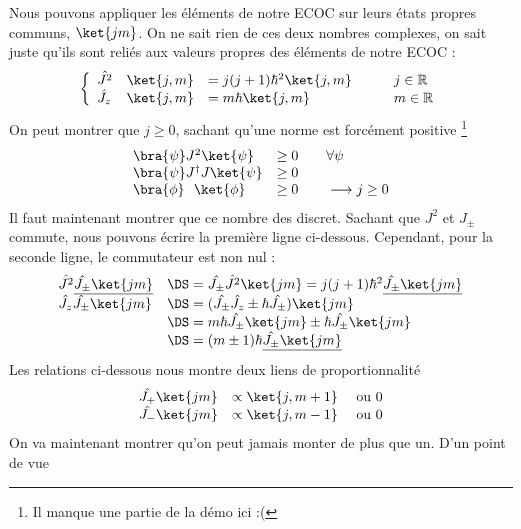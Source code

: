 Nous pouvons appliquer les éléments de notre ECOC sur leurs états propres communs, $\ket{jm}$. On 
ne sait rien de ces deux nombres complexes, on sait juste qu'ils sont reliés aux valeurs propres 
des éléments de notre ECOC :
\begin{equation}
\left\{\begin{array}{llll}
\hat{J^2} &\ket{j,m}&=j(j+1)\hbar^2\ket{j,m}&\qquad j\in\mathbb{R}\\
\hat{J_z} & \ket{j,m}&=m\hbar\ket{j,m}&\qquad m \in \mathbb{R}
\end{array}\right.
\end{equation}
On peut montrer que $j\geq 0$, sachant qu'une norme est forcément positive
\footnote{Il manque une partie de la démo ici :(}
\begin{equation}
\begin{array}{ll}
\bra{\psi}J^2\ket{\psi} &\geq 0\qquad\forall \psi\\
\bra{\psi}J^\dagger J\ket{\psi} &\geq 0\\
\bra{\phi}\ \ \ket{\phi} &\geq 0\qquad \longrightarrow j\geq 0
\end{array}
\end{equation}
Il faut maintenant montrer que ce nombre des discret. Sachant que $J^2$ et $J_\pm$ 
commute, nous pouvons écrire la première ligne ci-dessous. Cependant, pour la seconde 
ligne, le commutateur est non nul :
\begin{equation}
\begin{array}{ll}
\hat{J^2}\underline{\hat{J_\pm}\ket{jm}}&\DS = \hat{J_\pm}\hat{J^2}\ket{jm} =
 j(j+1)\hbar^2\underline{\hat{J_\pm}\ket{jm}}\\
\hat{J_z}\hat{J_\pm}\ket{jm}&\DS= (\hat{J_\pm}\hat{J_z}\pm\hbar\hat{J_\pm})\ket{jm}\\
&\DS= m\hbar\hat{J_\pm}\ket{jm}\pm \hbar\hat{J_\pm}\ket{jm}\\
&\DS= (m\pm 1)\hbar\underline{\hat{J_\pm}\ket{jm}}
\end{array}
\end{equation}
Les relations ci-dessous nous montre deux liens de proportionnalité
\begin{equation}
\begin{array}{ll}
\hat{J_+}\ket{jm} &\propto \ket{j,m+1}\quad \text{ ou } 0\\
\hat{J_-}\ket{jm} &\propto \ket{j,m-1}\quad \text{ ou } 0
\end{array}
\end{equation}
On va maintenant montrer qu'on peut jamais monter de plus que un. D'un point de vue 
